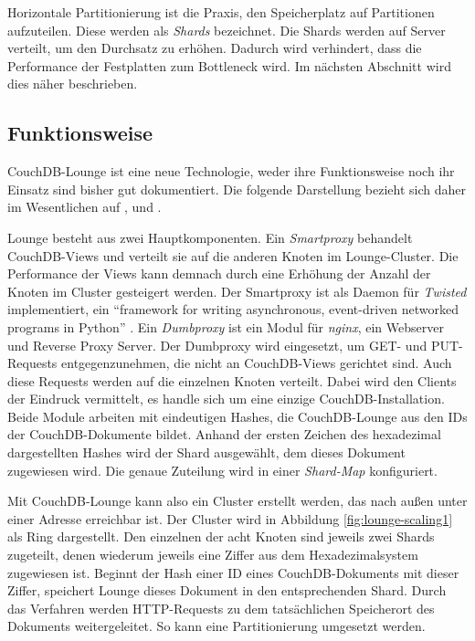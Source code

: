 Horizontale Partitionierung ist die Praxis, den Speicherplatz auf Partitionen aufzuteilen. Diese werden als \textit{Shards} bezeichnet. Die Shards werden auf Server verteilt, um den Durchsatz zu erhöhen. Dadurch wird verhindert, dass die Performance der Festplatten zum Bottleneck wird. Im nächsten Abschnitt wird dies näher beschrieben.

\subsection{Funktionsweise}

CouchDB-Lounge ist eine neue Technologie, weder ihre Funktionsweise noch ihr Einsatz sind bisher gut dokumentiert. Die folgende Darstellung bezieht sich daher im Wesentlichen auf , und \cite{lounge:wiki}.

Lounge besteht aus zwei Hauptkomponenten. Ein \textit{Smartproxy} behandelt CouchDB-Views und verteilt sie auf die anderen Knoten im Lounge-Cluster. Die Performance der Views kann demnach durch eine Erhöhung der Anzahl der Knoten im Cluster gesteigert werden. Der Smartproxy ist als Daemon für \textit{Twisted} implementiert, ein \enquote{framework for writing asynchronous, event-driven networked programs in Python} \cite{twisted}. Ein \textit{Dumbproxy} ist ein Modul für \textit{nginx}, ein Webserver und Reverse Proxy Server. Der Dumbproxy wird eingesetzt, um GET- und PUT-Requests entgegenzunehmen, die nicht an CouchDB-Views gerichtet sind. Auch diese Requests werden auf die einzelnen Knoten verteilt. Dabei wird den Clients der Eindruck vermittelt, es handle sich um eine einzige CouchDB-Installation. Beide Module arbeiten mit eindeutigen Hashes, die CouchDB-Lounge aus den IDs der CouchDB-Dokumente bildet. Anhand der ersten Zeichen des hexadezimal dargestellten Hashes wird der Shard ausgewählt, dem dieses Dokument zugewiesen wird. Die genaue Zuteilung wird in einer \textit{Shard-Map} konfiguriert.

Mit CouchDB-Lounge kann also ein Cluster erstellt werden, das nach außen unter einer Adresse erreichbar ist. Der Cluster wird in Abbildung \ref{fig:lounge-scaling1} als Ring dargestellt. Den einzelnen der acht Knoten sind jeweils zwei Shards zugeteilt, denen wiederum jeweils eine Ziffer aus dem Hexadezimalsystem zugewiesen ist. Beginnt der Hash einer ID eines CouchDB-Dokuments mit dieser Ziffer, speichert Lounge dieses Dokument in den entsprechenden Shard. Durch das Verfahren werden HTTP-Requests zu dem tatsächlichen Speicherort des Dokuments weitergeleitet. So kann eine Partitionierung umgesetzt werden.
 
